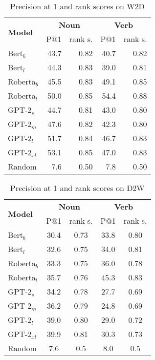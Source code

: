 \documentclass[11pt,a4paper]{article}
\begin{document}
\begin{table}
    \centering
    \begin{tabular}{l|rrrr}
        \hline
         \multirow{2}{*}{\textbf{Model}} & \multicolumn{2}{c}{\textbf{Noun}} & \multicolumn{2}{c}{\textbf{Verb}} \\
         & P@1 & rank s. & P@1 & \multicolumn{1}{c}{rank s.} \\ \hline
     Bert$_{b}$ & 43.7 & 0.82 & 40.7 & 0.82 \\
     Bert$_{l}$ & 44.3 & 0.83 & 39.0 & 0.81 \\
     Roberta$_{b}$ & 45.5 & 0.83 & 49.1 & 0.85 \\
     Roberta$_{l}$ & 50.0 & 0.85 & 54.4 & 0.88 \\ \hline
     GPT-2$_{s}$ & 44.7 & 0.81 & 43.0 & 0.80 \\
     GPT-2$_{m}$ & 47.6 & 0.82 & 42.3 & 0.80 \\
     GPT-2$_{l}$ & 51.7 & 0.84 & 46.7 & 0.83 \\
     GPT-2$_{xl}$ & 53.1 & 0.85 & 47.0 & 0.83 \\ \hline 
     Random & 7.6 & 0.50 & 7.8 & 0.50 \\\hline
     
    \end{tabular}
    \caption{Precision at 1 and rank scores on W2D}
    \label{tab:results_find_the_definition}
\end{table}


\begin{table}
    \centering
    \begin{tabular}{l|cccc}
        \hline
         \multirow{2}{*}{\textbf{Model}} & \multicolumn{2}{c}{\textbf{Noun}} & \multicolumn{2}{c}{\textbf{Verb}} \\
         & P@1 & rank s. & P@1 & rank s. \\ \hline
     Bert$_{b}$ & 30.4 & 0.73 & 33.8 & 0.80 \\
     Bert$_{l}$ & 32.6 & 0.75 & 34.0 & 0.81 \\
     Roberta$_{b}$ & 33.3 & 0.75 & 36.0 & 0.78 \\
     Roberta$_{l}$ & 35.7 & 0.76 & 45.3 & 0.83 \\ \hline
     GPT-2$_{s}$ & 34.2 & 0.78 & 27.7 & 0.69 \\
     GPT-2$_{m}$ & 36.2 & 0.79 & 24.8 & 0.69 \\
     GPT-2$_{l}$ & 39.0 & 0.80 & 29.0 & 0.72 \\
     GPT-2$_{xl}$ & 39.9 & 0.81 & 30.3 & 0.73 \\ \hline 
     Random & 7.6 & 0.5 & 8.0 & 0.5 \\\hline
     
    \end{tabular}
    \caption{Precision at 1 and rank scores on D2W}
    \label{tab:results_find_the_word}
\end{table}
\end{document}
